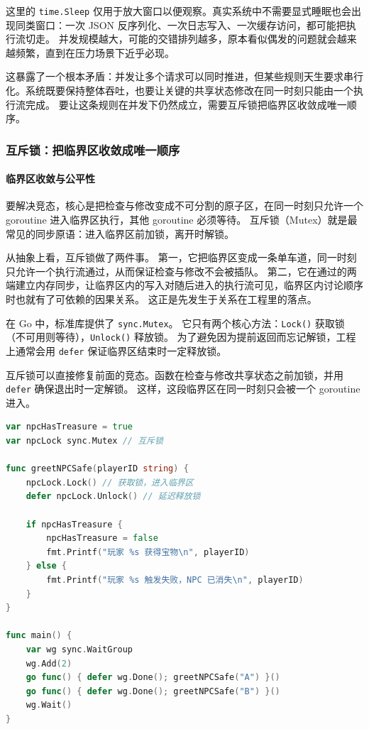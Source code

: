 这里的 \texttt{time.Sleep} 仅用于放大窗口以便观察。真实系统中不需要显式睡眠也会出现同类窗口：一次 JSON 反序列化、一次日志写入、一次缓存访问，都可能把执行流切走。
并发规模越大，可能的交错排列越多，原本看似偶发的问题就会越来越频繁，直到在压力场景下近乎必现。

这暴露了一个根本矛盾：并发让多个请求可以同时推进，但某些规则天生要求串行化。系统既要保持整体吞吐，也要让关键的共享状态修改在同一时刻只能由一个执行流完成。
要让这条规则在并发下仍然成立，需要互斥锁把临界区收敛成唯一顺序。

\subsubsection{互斥锁：把临界区收敛成唯一顺序}\label{sec3:mutex}

\paragraph{临界区收敛与公平性}

要解决竞态，核心是把检查与修改变成不可分割的原子区，在同一时刻只允许一个 goroutine 进入临界区执行，其他 goroutine 必须等待。
互斥锁（Mutex）就是最常见的同步原语：进入临界区前加锁，离开时解锁。

从抽象上看，互斥锁做了两件事。
第一，它把临界区变成一条单车道，同一时刻只允许一个执行流通过，从而保证检查与修改不会被插队。
第二，它在通过的两端建立内存同步，让临界区内的写入对随后进入的执行流可见，临界区内讨论顺序时也就有了可依赖的因果关系。
这正是先发生于关系在工程里的落点。

在 Go 中，标准库提供了 \texttt{sync.Mutex}。
它只有两个核心方法：\texttt{Lock()} 获取锁（不可用则等待），\texttt{Unlock()} 释放锁。
为了避免因为提前返回而忘记解锁，工程上通常会用 \texttt{defer} 保证临界区结束时一定释放锁。

互斥锁可以直接修复前面的竞态。函数在检查与修改共享状态之前加锁，并用 \texttt{defer} 确保退出时一定解锁。
这样，这段临界区在同一时刻只会被一个 goroutine 进入。

\begin{tcolorbox}[title=安全代码：使用Mutex保护共享资源]
\begin{lstlisting}[style=codeblock, language=go]
var npcHasTreasure = true
var npcLock sync.Mutex // 互斥锁
	
func greetNPCSafe(playerID string) {
    npcLock.Lock() // 获取锁，进入临界区
    defer npcLock.Unlock() // 延迟释放锁
    
    if npcHasTreasure {
        npcHasTreasure = false
        fmt.Printf("玩家 %s 获得宝物\n", playerID)
    } else {
        fmt.Printf("玩家 %s 触发失败，NPC 已消失\n", playerID)
    }
}

func main() {
    var wg sync.WaitGroup
    wg.Add(2)
    go func() { defer wg.Done(); greetNPCSafe("A") }()
    go func() { defer wg.Done(); greetNPCSafe("B") }()
    wg.Wait()
}
\end{lstlisting}
\end{tcolorbox}

